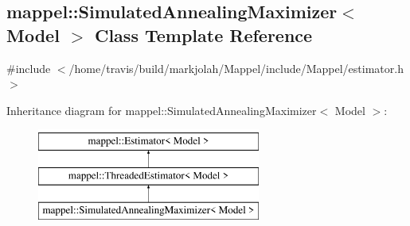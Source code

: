\hypertarget{classmappel_1_1SimulatedAnnealingMaximizer}{}\subsection{mappel\+:\+:Simulated\+Annealing\+Maximizer$<$ Model $>$ Class Template Reference}
\label{classmappel_1_1SimulatedAnnealingMaximizer}


{\ttfamily \#include $<$/home/travis/build/markjolah/\+Mappel/include/\+Mappel/estimator.\+h$>$}

Inheritance diagram for mappel\+:\+:Simulated\+Annealing\+Maximizer$<$ Model $>$\+:\begin{figure}[H]
\begin{center}
\leavevmode
\includegraphics[height=3.000000cm]{classmappel_1_1SimulatedAnnealingMaximizer}
\end{center}
\end{figure}
